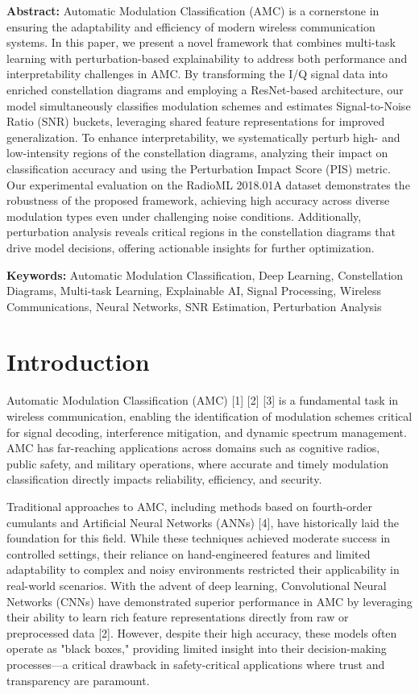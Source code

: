 \documentclass{ELSP}
\begin{document}
\noindent\textbf{\textcolor[RGB]{0,131,255}{Abstract:}} 
Automatic Modulation Classification (AMC) is a cornerstone in ensuring the adaptability and efficiency of modern wireless communication systems. In this paper, we present a novel framework that combines multi-task learning with perturbation-based explainability to address both performance and interpretability challenges in AMC. By transforming the I/Q signal data into enriched constellation diagrams and employing a ResNet-based architecture, our model simultaneously classifies modulation schemes and estimates Signal-to-Noise Ratio (SNR) buckets, leveraging shared feature representations for improved generalization. To enhance interpretability, we systematically perturb high- and low-intensity regions of the constellation diagrams, analyzing their impact on classification accuracy and using the Perturbation Impact Score (PIS) metric. Our experimental evaluation on the RadioML 2018.01A dataset demonstrates the robustness of the proposed framework, achieving high accuracy across diverse modulation types even under challenging noise conditions. Additionally, perturbation analysis reveals critical regions in the constellation diagrams that drive model decisions, offering actionable insights for further optimization.

\noindent\textbf{\textcolor[RGB]{0,131,255}{Keywords:}} 
Automatic Modulation Classification, Deep Learning, Constellation Diagrams, Multi-task Learning, Explainable AI, Signal Processing, Wireless Communications, Neural Networks, SNR Estimation, Perturbation Analysis

\section{Introduction}
Automatic Modulation Classification (AMC) [1] [2] [3] is a fundamental task in wireless communication, enabling the identification of modulation schemes critical for signal decoding, interference mitigation, and dynamic spectrum management. AMC has far-reaching applications across domains such as cognitive radios, public safety, and military operations, where accurate and timely modulation classification directly impacts reliability, efficiency, and security.

Traditional approaches to AMC, including methods based on fourth-order cumulants and Artificial Neural Networks (ANNs) [4], have historically laid the foundation for this field. While these techniques achieved moderate success in controlled settings, their reliance on hand-engineered features and limited adaptability to complex and noisy environments restricted their applicability in real-world scenarios. With the advent of deep learning, Convolutional Neural Networks (CNNs) have demonstrated superior performance in AMC by leveraging their ability to learn rich feature representations directly from raw or preprocessed data [2]. However, despite their high accuracy, these models often operate as "black boxes," providing limited insight into their decision-making processes—a critical drawback in safety-critical applications where trust and transparency are paramount.
\end{document}
